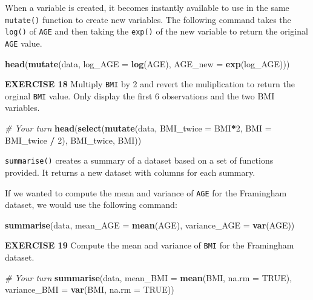 \documentclass[
]{article}
\newenvironment{Shaded}{\begin{snugshade}}{\end{snugshade}}
\newcommand{\CommentTok}[1]{\textcolor[rgb]{0.56,0.35,0.01}{\textit{#1}}}
\newcommand{\DataTypeTok}[1]{\textcolor[rgb]{0.13,0.29,0.53}{#1}}
\newcommand{\DecValTok}[1]{\textcolor[rgb]{0.00,0.00,0.81}{#1}}
\newcommand{\KeywordTok}[1]{\textcolor[rgb]{0.13,0.29,0.53}{\textbf{#1}}}
\newcommand{\NormalTok}[1]{#1}
\newcommand{\OperatorTok}[1]{\textcolor[rgb]{0.81,0.36,0.00}{\textbf{#1}}}
\newcommand{\OtherTok}[1]{\textcolor[rgb]{0.56,0.35,0.01}{#1}}
\newcommand{\StringTok}[1]{\textcolor[rgb]{0.31,0.60,0.02}{#1}}
\begin{document}
When a variable is created, it becomes instantly available to use in the
same \texttt{mutate()} function to create new variables. The following
command takes the \texttt{log()} of \texttt{AGE} and then taking the
\texttt{exp()} of the new variable to return the original \texttt{AGE}
value.

\begin{Shaded}
\begin{Highlighting}[]
\KeywordTok{head}\NormalTok{(}\KeywordTok{mutate}\NormalTok{(data, }\DataTypeTok{log_AGE =} \KeywordTok{log}\NormalTok{(AGE), }\DataTypeTok{AGE_new =} \KeywordTok{exp}\NormalTok{(log_AGE)))}
\end{Highlighting}
\end{Shaded}

\textbf{EXERCISE 18} Multiply \texttt{BMI} by 2 and revert the
muliplication to return the orginal \texttt{BMI} value. Only display the
first 6 observations and the two BMI variables.

\begin{Shaded}
\begin{Highlighting}[]
\CommentTok{# Your turn}
\KeywordTok{head}\NormalTok{(}\KeywordTok{select}\NormalTok{(}\KeywordTok{mutate}\NormalTok{(data, }\DataTypeTok{BMI_twice =}\NormalTok{ BMI}\OperatorTok{*}\DecValTok{2}\NormalTok{,}
                   \DataTypeTok{BMI =}\NormalTok{ BMI_twice }\OperatorTok{/}\StringTok{ }\DecValTok{2}\NormalTok{), BMI_twice, BMI))}
\end{Highlighting}
\end{Shaded}

\texttt{summarise()} creates a summary of a dataset based on a set of
functions provided. It returns a new dataset with columns for each
summary.

If we wanted to compute the mean and variance of \texttt{AGE} for the
Framingham dataset, we would use the following command:

\begin{Shaded}
\begin{Highlighting}[]
\KeywordTok{summarise}\NormalTok{(data, }\DataTypeTok{mean_AGE =} \KeywordTok{mean}\NormalTok{(AGE), }\DataTypeTok{variance_AGE =} \KeywordTok{var}\NormalTok{(AGE))}
\end{Highlighting}
\end{Shaded}

\textbf{EXERCISE 19} Compute the mean and variance of \texttt{BMI} for
the Framingham dataset.

\begin{Shaded}
\begin{Highlighting}[]
\CommentTok{# Your turn}
\KeywordTok{summarise}\NormalTok{(data, }\DataTypeTok{mean_BMI =} \KeywordTok{mean}\NormalTok{(BMI, }\DataTypeTok{na.rm =} \OtherTok{TRUE}\NormalTok{), }\DataTypeTok{variance_BMI =} \KeywordTok{var}\NormalTok{(BMI, }\DataTypeTok{na.rm =} \OtherTok{TRUE}\NormalTok{))}
\end{Highlighting}
\end{Shaded}
\end{document}
